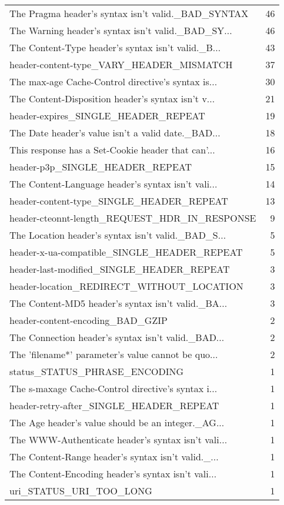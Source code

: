 \begin{tabular}{lr}
The Pragma header's syntax isn't valid.\_BAD\_SYNTAX &       46 \\
The Warning header's syntax isn't valid.\_BAD\_SY... &       46 \\
The Content-Type header's syntax isn't valid.\_B... &       43 \\
header-content-type\_VARY\_HEADER\_MISMATCH           &       37 \\
The max-age Cache-Control directive's syntax is... &       30 \\
The Content-Disposition header's syntax isn't v... &       21 \\
header-expires\_SINGLE\_HEADER\_REPEAT                &       19 \\
The Date header's value isn't a valid date.\_BAD... &       18 \\
This response has a Set-Cookie header that can'... &       16 \\
header-p3p\_SINGLE\_HEADER\_REPEAT                    &       15 \\
The Content-Language header's syntax isn't vali... &       14 \\
header-content-type\_SINGLE\_HEADER\_REPEAT           &       13 \\
header-cteonnt-length\_REQUEST\_HDR\_IN\_RESPONSE      &        9 \\
The Location header's syntax isn't valid.\_BAD\_S... &        5 \\
header-x-ua-compatible\_SINGLE\_HEADER\_REPEAT        &        5 \\
header-last-modified\_SINGLE\_HEADER\_REPEAT          &        3 \\
header-location\_REDIRECT\_WITHOUT\_LOCATION          &        3 \\
The Content-MD5 header's syntax isn't valid.\_BA... &        3 \\
header-content-encoding\_BAD\_GZIP                   &        2 \\
The Connection header's syntax isn't valid.\_BAD... &        2 \\
The 'filename*' parameter's value cannot be quo... &        2 \\
status\_STATUS\_PHRASE\_ENCODING                      &        1 \\
The s-maxage Cache-Control directive's syntax i... &        1 \\
header-retry-after\_SINGLE\_HEADER\_REPEAT            &        1 \\
The Age header's value should be an integer.\_AG... &        1 \\
The WWW-Authenticate header's syntax isn't vali... &        1 \\
The Content-Range header's syntax isn't valid.\_... &        1 \\
The Content-Encoding header's syntax isn't vali... &        1 \\
uri\_STATUS\_URI\_TOO\_LONG                            &        1 \\
\bottomrule
\end{tabular}
